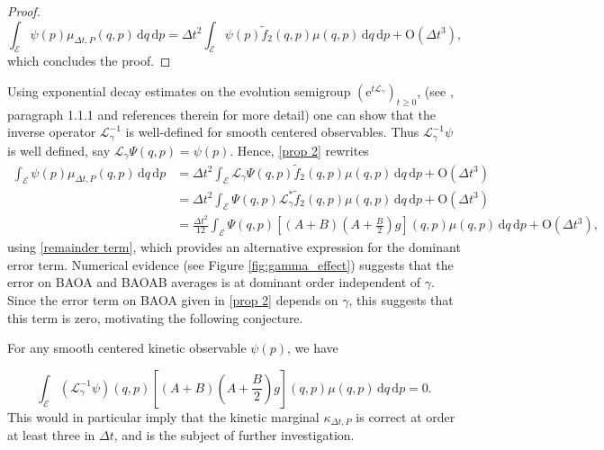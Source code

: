\begin{proof}
\begin{equation}
  \int_{\mathcal E} \psi(p) \mu_{\Delta t,P}(q,p)\,\mathrm{d}q\,\mathrm{d}p=\Delta t^2\int_{\mathcal E} \psi(p)\tilde f_2(q,p)\mu(q,p)\,\mathrm{d}q\,\mathrm{d}p + \mathrm{O}(\Delta t^3),
\end{equation}
which concludes the proof.
\end{proof}

\begin{remark}
Using exponential decay estimates on the evolution semigroup $(\mathrm{e}^{t\mathcal L_\gamma})_{t\geq 0}$, (see \cite{LMS13}, paragraph 1.1.1 and references therein for more detail) one can show that the inverse operator $\mathcal L_\gamma^{-1}$ is well-defined for smooth centered observables.
Thus $\mathcal L_\gamma^{-1} \psi$ is well defined, say $\mathcal L_\gamma \Psi(q,p)=\psi(p)$.
Hence, \eqref{prop 2} rewrites 
\begin{align*}
  \int_{\mathcal E} \psi(p) \mu_{\Delta t,P}(q,p)\,\mathrm{d}q\,\mathrm{d}p&=\Delta t^2\int_\mathcal{E}\mathcal L_\gamma \Psi(q,p)\tilde f_2(q,p)\mu(q,p)\,\mathrm{d}q\,\mathrm{d}p+\mathrm{O}(\Delta t^3)\\
  &=\Delta t^2\int_\mathcal{E}\Psi(q,p)\mathcal L_\gamma^*\tilde f_2(q,p)\mu(q,p)\,\mathrm{d}q\,\mathrm{d}p+\mathrm{O}(\Delta t^3)\\
  &=\frac{\Delta t^2}{12}\int_\mathcal{E}\Psi(q,p)\left[\left(A+B\right)\left(A+\frac B2\right)g\right](q,p)\mu(q,p)\,\mathrm{d}q\,\mathrm{d}p+\mathrm{O}(\Delta t^3),
\end{align*}
using \eqref{remainder term}, which provides an alternative expression for the dominant error term.
Numerical evidence (see Figure \ref{fig:gamma_effect}) suggests that the error on BAOA and BAOAB averages is at dominant order independent of $\gamma$. Since the error term on BAOA given in \eqref{prop 2} depends on $\gamma$, this suggests that this term is zero, motivating the following conjecture.
\end{remark}

\begin{conjecture}\label{conjecture}
  For any smooth centered kinetic observable $\psi(p)$, we have
  
  \begin{equation}
    \int_{\mathcal E}\left(\mathcal L_\gamma ^{-1}\psi\right)(q,p)\left[\left(A+B\right)\left(A+\frac B2\right)g\right](q,p)\mu(q,p)\,\mathrm{d}q\,\mathrm{d}p=0.
  \end{equation}
  This would in particular imply that the kinetic marginal $\kappa_{\Delta t,P}$ is correct at order at least three in $\Delta t$, and is the subject of further investigation.
\end{conjecture}

